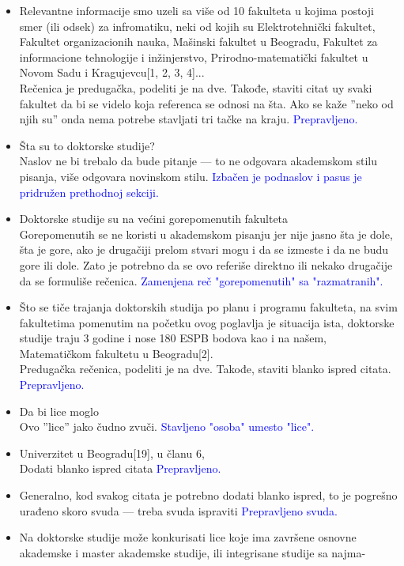 \documentclass[a4paper]{report}
\newcommand{\odgovor}[1]{\textcolor{blue}{#1}}
\begin{document}
\begin{itemize}
\item Relevantne informacije smo uzeli sa više
od 10 fakulteta u kojima postoji smer (ili odsek) za infromatiku, neki od
kojih su Elektrotehnički fakultet, Fakultet organizacionih nauka, Mašinski
fakultet u Beogradu, Fakultet za informacione tehnologije i inžinjerstvo,
Prirodno-matematički fakultet u Novom Sadu i Kragujevcu[1, 2, 3, 4]...\\
Rečenica je predugačka, podeliti je na dve. 
Takođe, staviti citat uy svaki fakultet da bi se videlo koja referenca se odnosi na šta.
Ako se kaže ''neko od njih su'' onda nema potrebe stavljati tri tačke na kraju. 
\odgovor{Prepravljeno.}
\item Šta su to doktorske studije?\\
Naslov ne bi trebalo da bude pitanje --- to ne odgovara akademskom stilu pisanja, više odgovara novinskom stilu. 
\odgovor{Izbačen je podnaslov i pasus je pridružen prethodnoj sekciji.}
\item Doktorske studije su na većini gorepomenutih fakulteta \\
Gorepomenutih se ne koristi u akademskom pisanju jer nije jasno šta je dole, šta je gore, ako je drugačiji prelom stvari mogu i da se izmeste i da ne budu gore ili dole. Zato je potrebno da se ovo referiše direktno ili nekako drugačije da se formuliše rečenica. 
\odgovor{Zamenjena reč "gorepomenutih"{} sa "razmatranih".}
\item Što se tiče trajanja doktorskih studija po planu i programu fakulteta,
na svim fakultetima pomenutim na početku ovog poglavlja je situacija
ista, doktorske studije traju 3 godine i nose 180 ESPB bodova kao i na
našem, Matematičkom fakultetu u Beogradu[2]. \\
Predugačka rečenica, podeliti je na dve. Takođe, staviti blanko ispred citata.
\odgovor{Prepravljeno.}
\item Da bi lice moglo \\
Ovo ''lice'' jako čudno zvuči.
\odgovor{Stavljeno "osoba"{} umesto "lice"{}.}
\item Univerzitet u Beogradu[19], u članu 6, \\
Dodati blanko ispred citata
\odgovor{Prepravljeno.}
\item Generalno, kod svakog citata je potrebno dodati blanko ispred, to je pogrešno urađeno skoro svuda --- treba svuda ispraviti
\odgovor{Prepravljeno svuda.}
\item Na doktorske studije može konkurisati lice koje ima završene osnovne
akademske i master akademske studije, ili integrisane studije sa najma-

\end{itemize}
\end{document}
